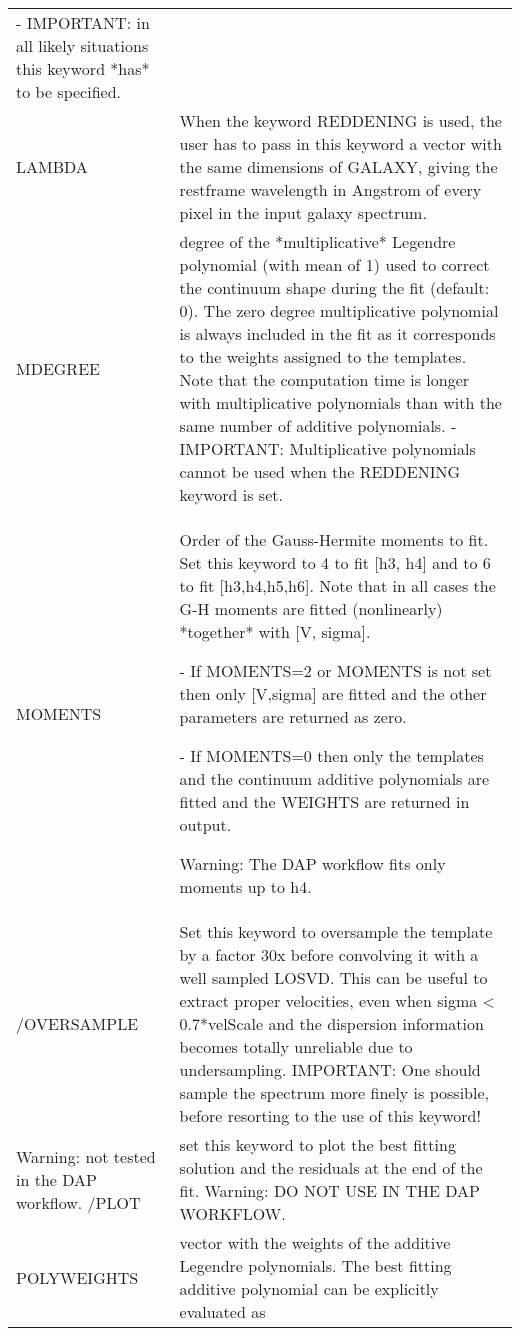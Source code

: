 \begin{center}
\begin{longtable}{p{2.7cm}| p{11.1cm}}
     - IMPORTANT: in all likely situations this keyword *has* to be specified.\\
%
   LAMBDA & When the keyword REDDENING is used, the user has to pass in this
       keyword a vector with the same dimensions of GALAXY, giving the restframe
       wavelength in Angstrom of every pixel in the input galaxy spectrum.\\
%
  MDEGREE & degree of the *multiplicative* Legendre polynomial (with mean of 1)
       used to correct the continuum shape during the fit (default: 0). The
       zero degree multiplicative polynomial is always included in the fit as
       it corresponds to the weights assigned to the templates.
       Note that the computation time is longer with multiplicative
       polynomials than with the same number of additive polynomials.
     - IMPORTANT: Multiplicative polynomials cannot be used when
       the REDDENING keyword is set.\\
%
   MOMENTS &  Order of the Gauss-Hermite moments to fit. Set this keyword to 4
       to fit [h3, h4] and to 6 to fit [h3,h4,h5,h6]. Note that in all cases
       the G-H moments are fitted (nonlinearly) *together* with [V, sigma].
 
      \smallskip

    - If MOMENTS=2 or MOMENTS is not set then only [V,sigma] are
       fitted and the other parameters are returned as zero.

      \smallskip

     - If MOMENTS=0 then only the templates and the continuum additive
       polynomials are fitted and the WEIGHTS are returned in output.

      \smallskip

       Warning: The DAP workflow fits only moments up to h4. \\
%
   /OVERSAMPLE & Set this keyword to oversample the template by a factor 30x
       before convolving it with a well sampled LOSVD. This can be useful to
       extract proper velocities, even when sigma < 0.7*velScale and the 
       dispersion information becomes totally unreliable due to undersampling. 
       IMPORTANT: One should sample the spectrum more finely is possible, 
       before resorting to the use of this keyword! \\

      \smallskip
 Warning: not tested in the DAP workflow.
%
   /PLOT &  set this keyword to plot the best fitting solution and the residuals
       at the end of the fit. Warning: DO NOT USE IN THE DAP WORKFLOW.\\
%
   POLYWEIGHTS & vector with the weights of the additive Legendre polynomials.
       The best fitting additive polynomial can be explicitly evaluated as
  

\end{longtable}
\end{center}
